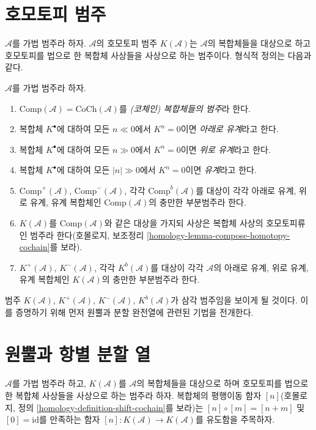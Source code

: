 \section{호모토피 범주}
\label{section-homotopy}

\noindent
$\mathcal{A}$를 가법 범주라 하자. $\mathcal{A}$의 호모토피 범주
$K(\mathcal{A})$는 $\mathcal{A}$의 복합체들을 대상으로 하고
호모토피를 법으로 한 복합체 사상들을 사상으로 하는 범주이다.
형식적 정의는 다음과 같다.

\begin{definition}
\label{definition-complexes-notation}
$\mathcal{A}$를 가법 범주라 하자.
\begin{enumerate}
\item $\text{Comp}(\mathcal{A}) = \text{CoCh}(\mathcal{A})$를
{\it (코체인) 복합체들의 범주}라 한다.
\item 복합체 $K^\bullet$에 대하여 모든 $n \ll 0$에서
$K^n = 0$이면 {\it 아래로 유계}라고 한다.
\item 복합체 $K^\bullet$에 대하여 모든 $n \gg 0$에서
$K^n = 0$이면 {\it 위로 유계}라고 한다.
\item 복합체 $K^\bullet$에 대하여 모든 $|n| \gg 0$에서
$K^n = 0$이면 {\it 유계}라고 한다.
\item $\text{Comp}^{+}(\mathcal{A})$, $\text{Comp}^{-}(\mathcal{A})$,
각각 $\text{Comp}^b(\mathcal{A})$를 대상이 각각 아래로 유계,
위로 유계, 유계 복합체인 $\text{Comp}(\mathcal{A})$의 충만한
부분범주라 한다.
\item $K(\mathcal{A})$를 $\text{Comp}(\mathcal{A})$와 같은 대상을
가지되 사상은 복합체 사상의 호모토피류인 범주라 한다(호몰로지,
보조정리 \ref{homology-lemma-compose-homotopy-cochain}를 보라).
\item $K^{+}(\mathcal{A})$, $K^{-}(\mathcal{A})$, 각각
$K^b(\mathcal{A})$를 대상이 각각 $\mathcal{A}$의 아래로 유계,
위로 유계, 유계 복합체인 $K(\mathcal{A})$의 충만한 부분범주라 한다.
\end{enumerate}
\end{definition}

\noindent
범주 $K(\mathcal{A})$, $K^{+}(\mathcal{A})$,
$K^{-}(\mathcal{A})$, $K^b(\mathcal{A})$가 삼각 범주임을 보이게 될
것이다. 이를 증명하기 위해 먼저 원뿔과 분할 완전열에 관련된
기법을 전개한다.

\section{원뿔과 항별 분할 열}
\label{section-cones}

\noindent
$\mathcal{A}$를 가법 범주라 하고, $K(\mathcal{A})$를
$\mathcal{A}$의 복합체들을 대상으로 하며 호모토피를 법으로 한
복합체 사상들을 사상으로 하는 범주라 하자. 복합체의 평행이동 함자
$[n]$(호몰로지, 정의 \ref{homology-definition-shift-cochain}를 보라)는
$[n] \circ [m] = [n + m]$ 및 $[0] = \text{id}$를 만족하는 함자
$[n] : K(\mathcal{A}) \to K(\mathcal{A})$를 유도함을 주목하자.

